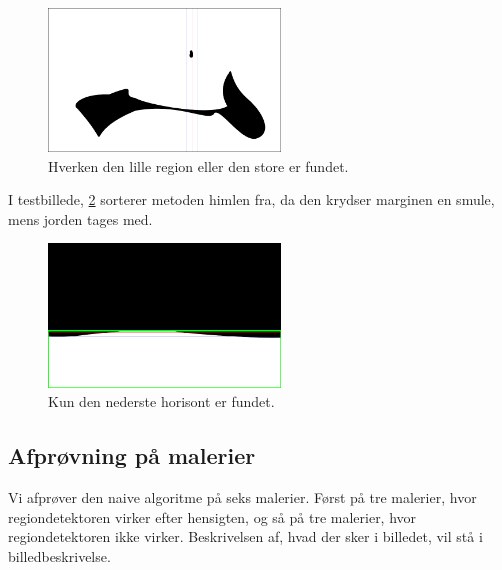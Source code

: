 \begin{figure}[!h]
	\begin{center}
       	\includegraphics[angle=0,width=0.55\textwidth]{afsnit/afprovning/billeder/naive_losning/naiv_blob2.png}
	\end{center}
	\caption{Hverken den lille region eller den store er fundet.} 
   	\label{naiv_blob2}
\end{figure}

I testbillede, \ref{naive_hoisont1} sorterer metoden
himlen fra, da den krydser marginen en smule, mens jorden tages med. 

\begin{figure}[!h]
	\begin{center}
       	\includegraphics[angle=0,width=0.55\textwidth]{afsnit/afprovning/billeder/naive_losning/naiv_hoisont1.png}
	\end{center}
	\caption{Kun den nederste horisont er fundet.} 
   	\label{naive_hoisont1}
\end{figure}

\clearpage

\subsection{Afprøvning på malerier}
Vi afprøver den naive algoritme på seks malerier. Først på tre malerier,
hvor regiondetektoren virker efter hensigten, og så på tre
malerier, hvor regiondetektoren ikke virker. Beskrivelsen af, hvad der
sker i billedet, vil stå i billedbeskrivelse.


